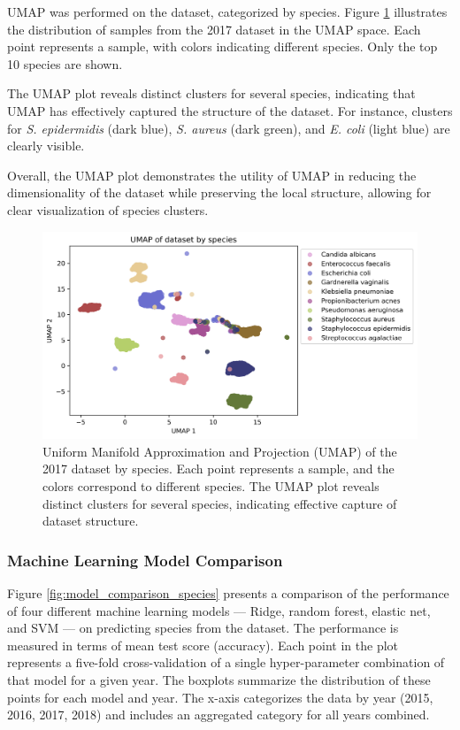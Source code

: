 \documentclass[english,11pt,a4paper,titlepage]{article}
\begin{document}
UMAP was performed on the dataset, categorized by species. Figure \ref{fig:species_umap} illustrates the distribution of samples from the 2017 dataset in the UMAP space. Each point represents a sample, with colors indicating different species. Only the top 10 species are shown.

The UMAP plot reveals distinct clusters for several species, indicating that UMAP has effectively captured the structure of the dataset. For instance, clusters for \textit{S. epidermidis} (dark blue), \textit{S. aureus} (dark green), and \textit{E. coli} (light blue) are clearly visible.

Overall, the UMAP plot demonstrates the utility of UMAP in reducing the dimensionality of the dataset while preserving the local structure, allowing for clear visualization of species clusters.
\begin{figure}[h]
	\centering
	\includegraphics[width=0.9\linewidth]{img/UMAP_species_noRemaining.png}
	\caption{Uniform Manifold Approximation and Projection (UMAP) of the 2017 dataset by species. Each point represents a sample, and the colors correspond to different species. The UMAP plot reveals distinct clusters for several species, indicating effective capture of dataset structure.}
	\label{fig:species_umap}
\end{figure}

\subsubsection*{Machine Learning Model Comparison}
Figure \ref{fig:model_comparison_species} presents a comparison of the performance of four different machine learning models — Ridge, random forest, elastic net, and SVM — on predicting species from the dataset. The performance is measured in terms of mean test score (accuracy). Each point in the plot represents a five-fold cross-validation of a single hyper-parameter combination of that model for a given year. The boxplots summarize the distribution of these points for each model and year. The x-axis categorizes the data by year (2015, 2016, 2017, 2018) and includes an aggregated category for all years combined.
\end{document}
